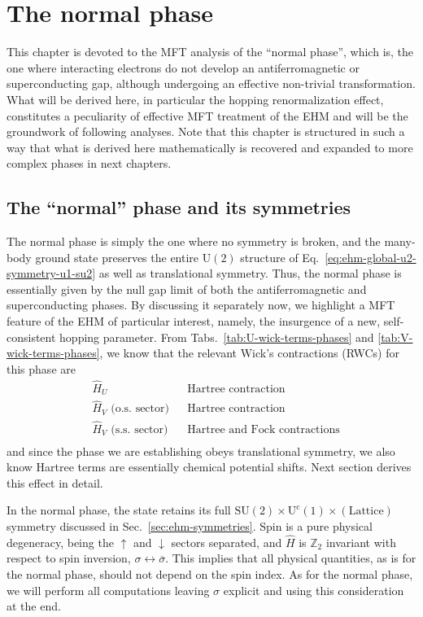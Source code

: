 \def\GraphicsFolder{parts/mft-analysis/chapters/normal-phase/pictures}
\chapter{The normal phase}\label{chap:normal-phase}

This chapter is devoted to the MFT analysis of the ``normal phase'', which is, the one where interacting electrons do not develop an antiferromagnetic or superconducting gap, although undergoing an effective non-trivial transformation. What will be derived here, in particular the hopping renormalization effect, constitutes a peculiarity of effective MFT treatment of the EHM and will be the groundwork of following analyses. Note that this chapter is structured in such a way that what is derived here mathematically is recovered and expanded to more complex phases in next chapters.

\section{The ``normal'' phase and its symmetries}\label{sec:normal-phase-theory}

The normal phase is simply the one where no symmetry is broken, and the many-body ground state preserves the entire $\mathrm{U}(2)$ structure of Eq.~\eqref{eq:ehm-global-u2-symmetry-u1-su2} as well as translational symmetry. Thus, the normal phase is essentially given by the null gap limit of both the antiferromagnetic and superconducting phases. By discussing it separately now, we highlight a MFT feature of the EHM of particular interest, namely, the insurgence of a new, self-consistent hopping parameter. From Tabs.~\ref{tab:U-wick-terms-phases} and \ref{tab:V-wick-terms-phases}, we know that the relevant Wick's contractions (RWCs) for this phase are
\[
\begin{aligned}
	&\hat H_U 
	&&\text{Hartree contraction} \\
	&\hat H_V \text{ (o.s. sector)}
	&&\text{Hartree contraction} \\
	&\hat H_V \text{ (s.s. sector)}
	&&\text{Hartree and Fock contractions} \\
\end{aligned}	
\]
and since the phase we are establishing obeys translational symmetry, we also know Hartree terms are essentially chemical potential shifts. Next section derives this effect in detail.

In the normal phase, the state retains its full $\mathrm{SU}(2) \times \mathrm{U}^\mathrm{c}(1) \times (\mathrm{Lattice})$ symmetry discussed in Sec.~\ref{sec:ehm-symmetries}. Spin is a pure physical degeneracy, being the $\uparrow$ and $\downarrow$ sectors separated, and $\hat H$ is $\mathbb{Z}_2$ invariant with respect to spin inversion, $\sigma \leftrightarrow \overline{\sigma}$. This implies that all physical quantities, as is for the normal phase, should not depend on the spin index. As for the normal phase, we will perform all computations leaving $\sigma$ explicit and using this consideration at the end.

